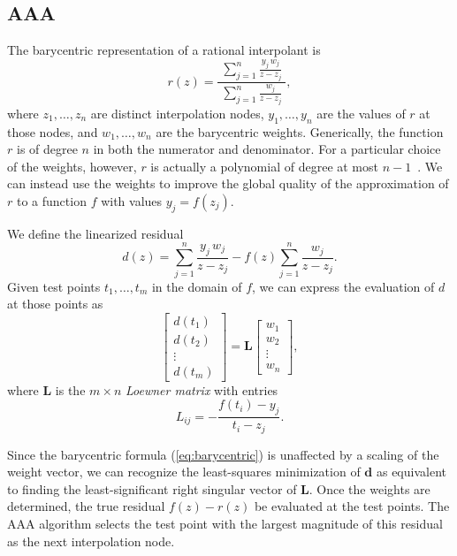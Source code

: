 \documentclass{juliacon}
\begin{document}
\subsection{AAA}
\label{sec:aaa}

The barycentric representation of a rational interpolant is
\begin{equation}
    \label{eq:barycentric}
    r(z) = \frac{ \; \displaystyle \sum_{j=1}^n \frac{y_j\, w_j}{z - z_j} \; }{ \displaystyle \sum_{j=1}^n \frac{w_j}{z - z_j} },
\end{equation}
where $z_1, \ldots, z_n$ are distinct interpolation nodes, $y_1, \ldots, y_n$ are the values of $r$ at those nodes, and $w_1, \ldots, w_n$ are the barycentric weights. Generically, the function $r$ is of degree $n$ in both the numerator and denominator. For a particular choice of the weights, however, $r$ is actually a polynomial of degree at most $n-1$~\cite{berrutBarycentricLagrange2004}. We can instead use the weights to improve the global quality of the approximation of $r$ to a function $f$ with values $y_j = f(z_j)$.

We define the linearized residual
\begin{equation}
    \label{eq:residual}
    d(z) = \sum_{j=1}^n \frac{y_j\, w_j}{z - z_j} - f(z) \sum_{j=1}^n \frac{w_j}{z - z_j}.
\end{equation}
Given test points $t_1, \ldots, t_m$ in the domain of $f$, we can express the evaluation of $d$ at those points as
\begin{equation}
    \label{eq:residuals}
    \begin{bmatrix} d(t_1) \\ d(t_2) \\ \vdots \\ d(t_m) \end{bmatrix} = \bm{L} \begin{bmatrix} w_1 \\ w_2 \\ \vdots \\ w_n \end{bmatrix},
\end{equation}
where $\bm{L}$ is the $m \times n$ \emph{Loewner matrix} with entries
\begin{equation}
    \label{eq:loewner}
    L_{ij} = - \frac{f(t_i) - y_j}{t_i - z_j}.
\end{equation}

Since the barycentric formula (\ref{eq:barycentric}) is unaffected by a scaling of the weight vector, we can recognize the least-squares minimization of $\bm{d}$ as equivalent to finding the least-significant right singular vector of $\bm{L}$. Once the weights are determined, the true residual $f(z) - r(z)$ be evaluated at the test points. The AAA algorithm selects the test point with the largest magnitude of this residual as the next interpolation node.
\end{document}
